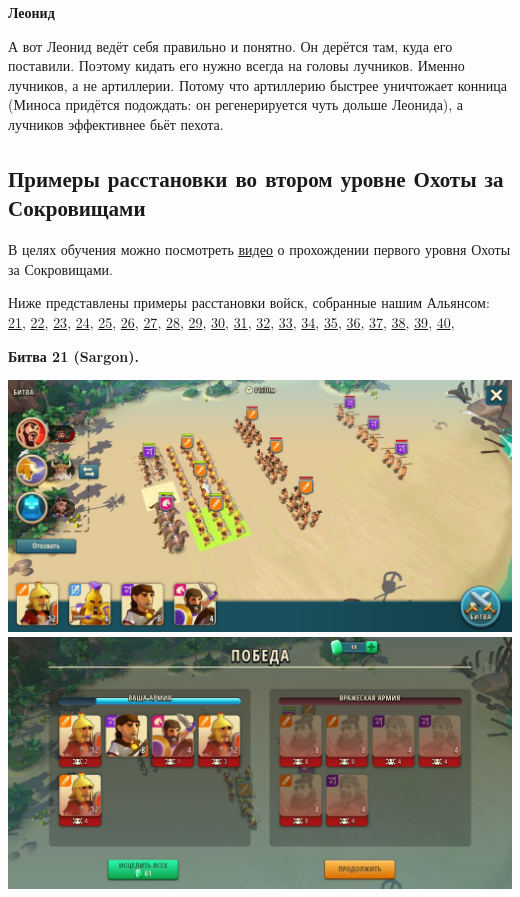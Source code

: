 \textbf{Леонид}

А вот Леонид ведёт себя правильно и понятно.
Он дерётся там, куда его поставили.
Поэтому кидать его нужно всегда на головы лучников.
Именно лучников, а не артиллерии.
Потому что артиллерию быстрее уничтожает конница (Миноса придётся подождать: он регенерируется чуть дольше Леонида),
а лучников эффективнее бьёт пехота.

\subsection{Примеры расстановки во втором уровне Охоты за Сокровищами}

В целях обучения можно посмотреть
\underline{\href{https://youtu.be/JD1PWm27lHg}{видео}}
о прохождении первого уровня Охоты за Сокровищами.

Ниже представлены примеры расстановки войск, собранные нашим Альянсом:
\hyperlink{fight21}{21}, 
\hyperlink{fight22}{22}, 
\hyperlink{fight23}{23}, 
\hyperlink{fight24}{24}, 
\hyperlink{fight25}{25}, 
\hyperlink{fight26}{26}, 
\hyperlink{fight27}{27}, 
\hyperlink{fight28}{28}, 
\hyperlink{fight29}{29}, 
\hyperlink{fight30}{30}, 
\hyperlink{fight31}{31}, 
\hyperlink{fight32}{32}, 
\hyperlink{fight33}{33}, 
\hyperlink{fight34}{34}, 
\hyperlink{fight35}{35}, 
\hyperlink{fight36}{36}, 
\hyperlink{fight37}{37}, 
\hyperlink{fight38}{38}, 
\hyperlink{fight39}{39}, 
\hyperlink{fight40}{40}, 

\newpage
\begin{center}
	\hypertarget{fight21}{\textbf{Битва 21 (Sargon).}}
\end{center}
\noindent\includegraphics[width=\linewidth]{./parts/media/TreasureHunt/21/sargon/photo_2022-04-06_18-11-33.jpg} \newline
\noindent\includegraphics[width=\linewidth]{./parts/media/TreasureHunt/21/sargon/photo_2022-04-06_18-11-59.jpg} \newline

